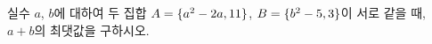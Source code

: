 실수 $a$, $b$에 대하여 두 집합 $A=\{a^2-2a{,}\mkern3mu\mathopen{}11\}$, $B=\{b^2-5{,}\mkern3mu\mathopen{}3\}$이 서로 같을 때, $a+b$의 최댓값을 구하시오.

